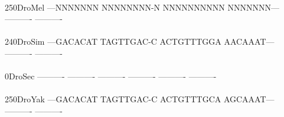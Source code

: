 \documentclass[11pt,twoside,reqno,a4paper]{article}
\begin{document}
{\\
250\hspace*{1\charwidth}DroMel	---NNNNNNN	NNNNNNNN-N	NNNNNNNNNN	NNNNNNN---	----------	----------	\\
\hspace*{4\charwidth}\hspace*{7\charwidth}\hspace*{1\charwidth}\hspace*{1\charwidth}\hspace*{1\charwidth}\hspace*{1\charwidth}\hspace*{1\charwidth}\hspace*{1\charwidth}\\
240\hspace*{1\charwidth}DroSim	---GACACAT	TAGTTGAC-C	ACTGTTTGGA	AACAAAT---	----------	----------	\\
\hspace*{4\charwidth}\hspace*{7\charwidth}\hspace*{1\charwidth}\hspace*{1\charwidth}\hspace*{1\charwidth}\hspace*{1\charwidth}\hspace*{1\charwidth}\hspace*{1\charwidth}\\
0\hspace*{3\charwidth}DroSec	----------	----------	----------	----------	----------	----------	\\
\hspace*{4\charwidth}\hspace*{7\charwidth}\hspace*{1\charwidth}\hspace*{1\charwidth}\hspace*{1\charwidth}\hspace*{1\charwidth}\hspace*{1\charwidth}\hspace*{1\charwidth}\\
250\hspace*{1\charwidth}DroYak	---GACACAT	TAGTTGAC-C	ACTGTTTGCA	AGCAAAT---	----------	----------	\\
\hspace*{4\charwidth}\hspace*{7\charwidth}\hspace*{1\charwidth}\hspace*{1\charwidth}\hspace*{1\charwidth}\hspace*{1\charwidth}\hspace*{1\charwidth}\hspace*{1\charwidth}\\
}
\end{document}
